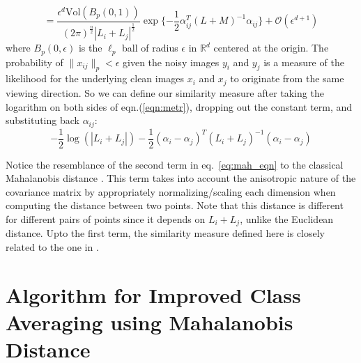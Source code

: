 \documentclass{article}
\begin{document}
\begin{equation}
= \frac{\epsilon^d \text{Vol}(B_p(0,1)) }{(2 \pi)^{\frac{n}{2}} |L_i + L_j|^{\frac{1}{2}}} \exp\{-\frac{1}{2}\alpha_{ij}^T(L+M)^{-1}\alpha_{ij}\} +  \mathcal{O}(\epsilon^{d+1}) 
\label{eqn:metr}
\end{equation}
where $B_p(0,\epsilon)$ is the $\ell_p$ ball of radius $\epsilon$ in $\mathbb{R}^d$ centered at the origin. The probability of $\|x_{ij}\|_p < \epsilon$ given the noisy images $y_i$ and $y_j$  is a measure of the likelihood for the underlying clean images $x_i$ and $x_j$ to originate from the same viewing direction. So we can define our similarity measure after taking the logarithm on both sides of eqn.(\ref{eqn:metr}), dropping out the constant term, and substituting back $\alpha_{ij}$:
\begin{equation}\label{eq:mah_eqn}
 -\frac{1}{2}\log(|L_i + L_j|) -\frac{1}{2}(\alpha_i - \alpha_j)^T(L_i+L_j)^{-1}(\alpha_i -\alpha_j)
\end{equation}

Notice the resemblance of the second term in eq.~\eqref{eq:mah_eqn} to the classical Mahalanobis distance \cite{mah}. This term takes into account the anisotropic nature of the covariance matrix by appropriately normalizing/scaling each dimension when computing the distance between two points. Note that this distance is different for different pairs of points since it depends on $L_i + L_j$, unlike the Euclidean distance. Upto the first term, the similarity measure defined here is closely related to the one in \cite{nlica}. 

\section{Algorithm for Improved Class Averaging using Mahalanobis Distance}
\end{document}
